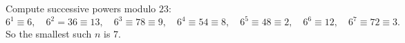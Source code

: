 Compute successive powers modulo $23$:
\[6^1\equiv6,\quad6^2=36\equiv13,\quad6^3\equiv78\equiv9,\quad6^4\equiv54\equiv8,\quad6^5\equiv48\equiv2,\quad6^6\equiv12,\quad6^7\equiv72\equiv3.\]
So the smallest such $n$ is $\boxed{7}$.
